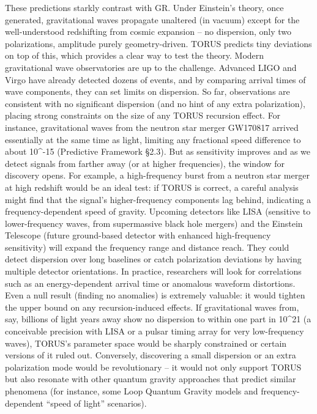 \documentclass[
]{article}
\begin{document}
These predictions starkly contrast with GR. Under Einstein's theory,
once generated, gravitational waves propagate unaltered (in vacuum)
except for the well-understood redshifting from cosmic expansion -- no
dispersion, only two polarizations, amplitude purely geometry-driven.
TORUS predicts tiny deviations on top of this, which provides a clear
way to test the theory. Modern gravitational wave observatories are up
to the challenge. Advanced LIGO and Virgo have already detected dozens
of events, and by comparing arrival times of wave components, they can
set limits on dispersion. So far, observations are consistent with no
significant dispersion (and no hint of any extra polarization), placing
strong constraints on the size of any TORUS recursion effect. For
instance, gravitational waves from the neutron star merger GW170817
arrived essentially at the same time as light, limiting any fractional
speed difference to about 10\^{}-15 (Predictive Framework §2.3). But as
sensitivity improves and as we detect signals from farther away (or at
higher frequencies), the window for discovery opens. For example, a
high-frequency burst from a neutron star merger at high redshift would
be an ideal test: if TORUS is correct, a careful analysis might find
that the signal's higher-frequency components lag behind, indicating a
frequency-dependent speed of gravity. Upcoming detectors like LISA
(sensitive to lower-frequency waves, from supermassive black hole
mergers) and the Einstein Telescope (future ground-based detector with
enhanced high-frequency sensitivity) will expand the frequency range and
distance reach. They could detect dispersion over long baselines or
catch polarization deviations by having multiple detector orientations.
In practice, researchers will look for correlations such as an
energy-dependent arrival time or anomalous waveform distortions. Even a
null result (finding no anomalies) is extremely valuable: it would
tighten the upper bound on any recursion-induced effects. If
gravitational waves from, say, billions of light years away show no
dispersion to within one part in 10\^{}21 (a conceivable precision with
LISA or a pulsar timing array for very low-frequency waves), TORUS's
parameter space would be sharply constrained or certain versions of it
ruled out. Conversely, discovering a small dispersion or an extra
polarization mode would be revolutionary -- it would not only support
TORUS but also resonate with other quantum gravity approaches that
predict similar phenomena (for instance, some Loop Quantum Gravity
models and frequency-dependent ``speed of light'' scenarios).
\end{document}
